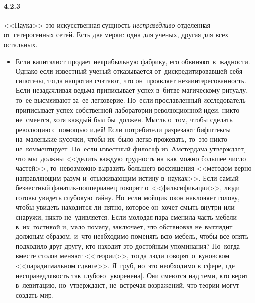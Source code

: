 \paragraph{4.2.3}\hypertarget{par:4.2.3}{} <<Наука>> это искусственная сущность {\itshape несправедливо} отделенная от~гетерогенных сетей. Есть две мерки: одна для ученых, другая для всех остальных. 
	\begin{itemize}
	\item 
	Если капиталист продает неприбыльную фабрику, его обвиняют в~жадности. Однако если известный ученый отказывается от~дискредитировавшей себя гипотезы, тогда напротив считают, что он~проявляет незаинтересованность. Если незадачливая ведьма приписывает успех в~битве магическому ритуалу, то~ее высмеивают за~ее легковерие. Но~если прославленный исследователь приписывает успех собственной лаборатории революционной идеи, никто не~смеется, хотя каждый был бы~должен. Мысль о~том, чтобы сделать революцию с~помощью идей! Если потребители разрезают бифштексы на~маленькие кусочки, чтобы их~было легко прожевать, то~это никто не~комментирует. Но~если известный философ из~Амстердама утверждает, что мы~должны <<делить каждую трудность на~как можно большее число частей>>, то~невозможно выразить большего восхищения <<методом верно направляющим разум и~отыскивающим истину в~науках>>. Если самый безвестный фанатик-попперианец говорит о~<<фальсификации>>, люди готовы увидеть глубокую тайну. Но~если мойщик окон наклоняет голову, чтобы увидеть находится ли~пятно, которое он~хочет смыть внутри или снаружи, никто не~удивляется. Если молодая пара сменила часть мебели в~их~гостиной и, мало помалу, заключает, что обстановка не~выглядит должным образом, и~что необходимо поменять всю мебель, чтобы все опять подходило друг другу, кто находит это достойным упоминания? Но~когда вместе столов меняют <<теории>>, тогда люди говорят о~куновском <<парадигмальном сдвиге>>. Я~груб, но~это необходимо в~сфере, где несправедливость так глубоко [укоренена]. Они смеются над теми, кто верит в~левитацию, но~утверждают, не~встречая возражений, что теории могут создать мир.
	\end{itemize}	


